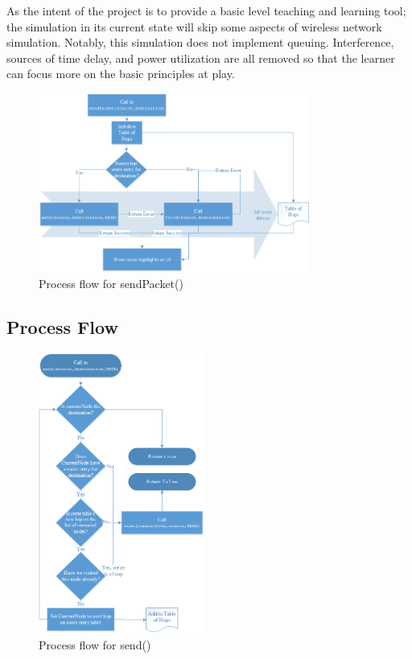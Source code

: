 \documentclass[conference]{IEEEtran}
\begin{document}
As the intent of the project is to provide a basic level teaching and learning tool; the simulation in its current state will skip some aspects of wireless network simulation. Notably, this simulation does not implement queuing. Interference, sources of time delay, and power utilization are all removed so that the learner can focus more on the basic principles at play.

\begin{figure}
	\centering
	\includegraphics[width=3.5in]{sendPacket.png}
	\caption{Process flow for sendPacket()}
	\label{fig:sendPacket}
\end{figure}

\subsection{Process Flow}

\begin{figure}
	\centering
	\includegraphics[width=2.15in]{send.png}
	\caption{Process flow for send()}
	\label{fig:send}
\end{figure}
\end{document}
